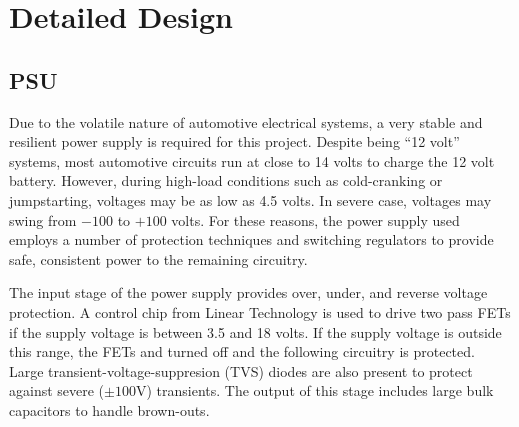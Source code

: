 \chapter{Detailed Design}




\section{PSU}
Due to the volatile nature of automotive electrical systems, a very stable and 
resilient power supply is required for this project.  Despite being ``12 volt''
systems, most automotive circuits run at close to 14 volts to charge the 12
volt battery.  However, during high-load conditions such as cold-cranking or
jumpstarting, voltages may be as low as 4.5 volts.  In severe case, voltages
may swing from $-100$ to $+100$ volts.  For these reasons, the power supply used
employs a number of protection techniques and switching regulators to provide
safe, consistent power to the remaining circuitry.

The input stage of the power supply provides over, under, and reverse voltage
protection.  A control chip from Linear Technology is used to drive two pass
FETs if the supply voltage is between 3.5 and 18 volts.  If the supply voltage
is outside this range, the FETs and turned off and the following circuitry is
protected.  Large transient-voltage-suppresion (TVS) diodes are also present to
protect against severe ($\pm 100$V) transients.  The output of this stage includes
large bulk capacitors to handle brown-outs.

